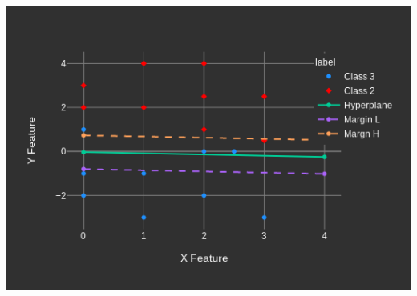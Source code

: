 \documentclass[12pt]{article}%
\begin{document}
	\includegraphics[scale=.3]{./sim3.png}\\
\end{document}
